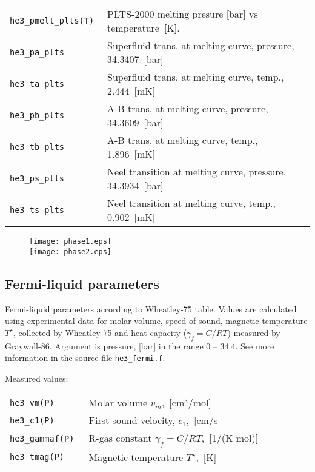 \documentclass[a4paper]{article}
\begin{document}
\medskip
\noindent\begin{tabular}{lp{11cm}}
\tt he3\_pmelt\_plts(T) & PLTS-2000 melting presure [bar] vs temperature~[K].\\
\tt he3\_pa\_plts       & Superfluid trans. at melting curve, pressure, 34.3407~[bar]\\
\tt he3\_ta\_plts       & Superfluid trans. at melting curve, temp., 2.444~[mK]\\
\tt he3\_pb\_plts       & A-B trans. at melting curve, pressure, 34.3609~[bar]\\
\tt he3\_tb\_plts       & A-B trans. at melting curve, temp., 1.896~[mK]\\
\tt he3\_ps\_plts       & Neel transition at melting curve, pressure, 34.3934~[bar]\\
\tt he3\_ts\_plts       & Neel transition at melting curve, temp., 0.902~[mK]\\
\end{tabular}
\medskip

\begin{figure}[p]
\texttt{[image: phase1.eps]}\\
\texttt{[image: phase2.eps]}
\end{figure}

\eject
\subsection*{Fermi-liquid parameters}

Fermi-liquid parameters according to {Wheatley-75} table. Values are
calculated using experimental data for molar volume, speed of sound,
magnetic temperature $T^\star$, collected by {Wheatley-75} and heat
capacity ($\gamma_f=C/RT$) measured by {Graywall-86}. Argument is
pressure, [bar] in the range 0 -- 34.4. See more information in the
source file {\tt he3\_fermi.f}.

\medskip
Measured values:

\medskip
\noindent\begin{tabular}{lp{11cm}}
\tt he3\_vm(P)     & Molar volume $v_m$,~[cm$^3$/mol]\\
\tt he3\_c1(P)     & First sound velocity, $c_1$,~[cm/s]\\
\tt he3\_gammaf(P) & R-gas constant $\gamma_f = C/RT$,~[1/(K mol)]\\
\tt he3\_tmag(P)   & Magnetic temperature $T^\star$,~[K]\newline\\
\end{tabular}
\end{document}
